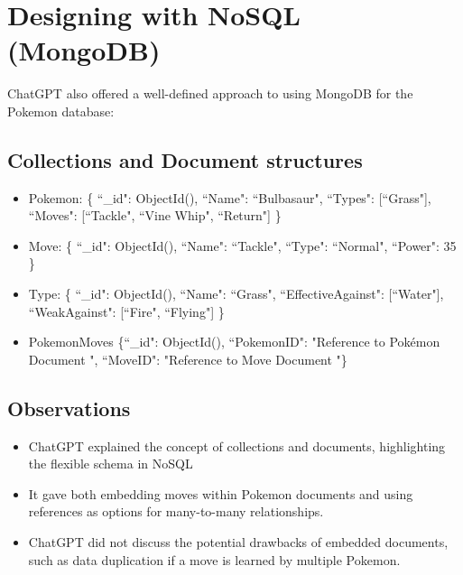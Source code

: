 \documentclass{article}
\begin{document}
\section{Designing with NoSQL (MongoDB)}
ChatGPT also offered a well-defined approach to using MongoDB for the Pokemon database:
\subsection{Collections and Document structures}
\begin{itemize}
    \item Pokemon: \{ ``\_id": ObjectId(), ``Name": ``Bulbasaur", ``Types": [``Grass"], ``Moves": [``Tackle", ``Vine Whip", ``Return"] \}
    \item Move: \{ ``\_id": ObjectId(), ``Name": ``Tackle", ``Type": ``Normal", ``Power": 35 \}
    \item Type: \{ ``\_id": ObjectId(), ``Name": ``Grass", ``EffectiveAgainst": [``Water"], ``WeakAgainst": [``Fire", ``Flying"] \}
    \item PokemonMoves \{``\_id": ObjectId(),
    ``PokemonID": "\le Reference to Pokémon Document \ge",
    ``MoveID": "\le Reference to Move Document \ge"\}

\end{itemize}
\subsection{Observations}
\begin{itemize}
    \item ChatGPT explained the concept of collections and documents, highlighting the flexible schema in NoSQL
    \item It gave both embedding moves within Pokemon documents and using references as options for many-to-many relationships.
    \item ChatGPT did not discuss the potential drawbacks of embedded documents, such as data duplication if a move is learned by multiple Pokemon.
\end{itemize}
\end{document}
